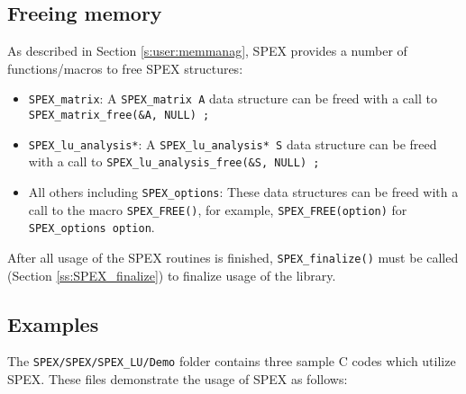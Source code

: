 \documentclass[12pt]{report}
\theoremstyle{definition}
\begin{document}
\cprotect\subsection{Freeing memory}
\label{s:Using:free}

As described in Section \ref{s:user:memmanag}, SPEX provides a number
of functions/macros to free SPEX structures:

\begin{itemize}
\item \verb|SPEX_matrix|: A \verb|SPEX_matrix A| data structure can be freed
with a call to \verb|SPEX_matrix_free(&A, NULL) ;|

\item \verb|SPEX_lu_analysis*|: A \verb|SPEX_lu_analysis* S| data structure can
be freed with a call to \verb|SPEX_lu_analysis_free(&S, NULL) ;|

\item All others including \verb|SPEX_options|: These data structures can be
freed with a call to the macro \verb|SPEX_FREE()|, for example,
\verb|SPEX_FREE(option)| for \newline
\verb|SPEX_options option|.

\end{itemize}

After all usage of the SPEX routines is finished, \verb|SPEX_finalize()|
must be called (Section \ref{ss:SPEX_finalize}) to finalize usage of the
library.

\cprotect\subsection{Examples}
\label{s:Using:Examples}

The \verb|SPEX/SPEX/SPEX_LU/Demo| folder contains three sample C codes
which utilize SPEX. These files demonstrate the usage of SPEX as
follows:
\end{document}
